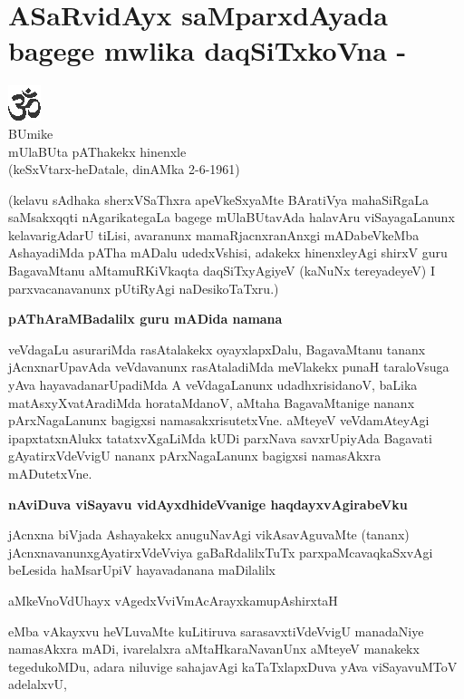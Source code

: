 \chapter{ASaRvidAyx saMparxdAyada bagege mwlika daqSiTxkoVna - }

\begin{center}
{\includegraphics[scale=.9]{om.eps}}\\[2pt]
BUmike\\[2pt]
mUlaBUta pAThakekx hinenxle\\[2pt]
(keSxVtarx-heDatale, dinAMka 2-6-1961)
\end{center}

\noindent
(kelavu sAdhaka sherxVSaThxra apeVkeSxyaMte BAratiVya mahaSiRgaLa saMsakxqqti nAgarikate\-gaLa bagege mUla\-BUta\-vAda halavAru viSayagaLanunx kelavarigAdarU tiLisi, avaranunx mamaRjacnxranAnxgi mADabeVkeMba Ashaya\-diMda pATha mADalu udedxVshisi, adakekx hinenxleyAgi shirxV guru BagavaMtanu aMtamuRKiVkaqta daqSiTx\-yAgi\-yeV (kaNuNx tereyadeyeV) I parxvacanavanunx pUtiRyAgi naDesikoTaTxru.)


{\bigskip
\noindent
{\large\bf pAThAraMBadalilx guru mADida namana}}\label{page64}
\medskip

\noindent
veVdagaLu asurariMda rasAtalakekx oyayxlapxDalu, BagavaMtanu tananx jAcnxnarUpavAda veVda\-vanunx rasA\-tala\-diMda meVlakekx punaH taraloVsuga yAva hayavadana\-rUpa\-diMda A veVda\-gaLanunx udadhxrisidanoV, baLika matAsxyXvatAradiMda hora\-taMdanoV, aMtaha BagavaMtanige nananx pArxNa\-gaLanunx bagigxsi namasakxrisu\-tetxVne. aMteyeV veVdamAteyAgi ipapxtatxnAlukx tatatxvXgaLiMda kUDi parx\-Nava savxrUpiyAda Bagavati gAya\-tirxV\-deVvigU nananx pArxNagaLanunx bagigxsi namasAkxra mADutetxVne.

{\bigskip
\noindent
{\large\bf nAviDuva viSayavu vidAyxdhideVvanige haqdayxvAgirabeVku}}\label{page64}
\medskip

\noindent
jAcnxna biVjada Ashayakekx anuguNavAgi vikAsavAguvaMte (tananx) jAcnxnavanunx\break gAyatirxV\-deVviya gaBaR\-dalilxTuTx parxpaMcavaqkaSxvAgi beLesida haMsarUpiV haya\-vadanana maDilalilx

\begin{shloka}
aMkeVnoVdUhayx vAgedxVviVmAcArayxkamupAshirxtaH\label{page64, 84}
\end{shloka} 

\noindent
eMba vAkayxvu heVLuvaMte kuLitiruva sarasavxtiVdeVvigU manadaNiye namasAkxra mADi, iva\-relalxra aMtaH\-karaNavanUnx aMteyeV manakekx tegedukoMDu, adara niluvige sahajavAgi kaTaTxlapxDuva yAva viSaya\-vuMToV adelalxvU, 

